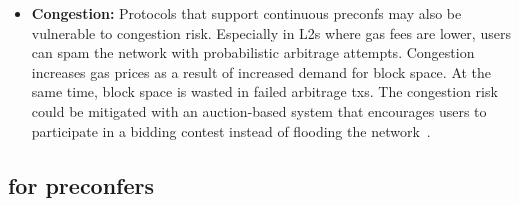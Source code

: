 \documentclass[a4paper]{article}
\theoremstyle{boldstyle}
\begin{document}
\begin{itemize}
        \item \textbf{Congestion:} 
        Protocols that support continuous preconfs may also be vulnerable to congestion risk. Especially in L2s where gas fees are lower, users can spam the network with probabilistic arbitrage attempts. Congestion increases gas prices as a result of increased demand for block space. At the same time, block space is wasted in failed arbitrage txs. The congestion risk could be mitigated with an auction-based system that encourages users to participate in a bidding contest instead of flooding the network~\cite{W:StrawmanningBasedPreconfirmations,W:BasedPreconfirmationswithMulti-roundMEV-Boost}.
    
    \end{itemize}

    \subsection{for preconfers}
\end{document}

